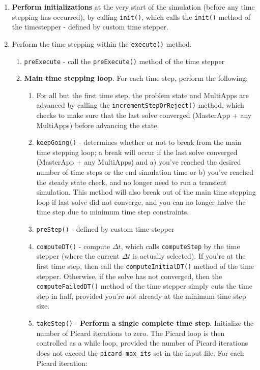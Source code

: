 \documentclass[10pt]{article}
\numberwithin{equation}{section} %
\begin{document}
\begin{enumerate}
\item {\bf Perform initializations} at the very start of the simulation (before any time stepping has occurred), by calling {\tt init()}, which calls the {\tt init()} method of the timestepper - defined by custom time stepper. 
\item Perform the time stepping within the {\tt execute()} method.
	\begin{enumerate}
	\item {\tt preExecute} - call the {\tt preExecute()} method of the time stepper%
	\item {\bf Main time stepping loop}. For each time step, perform the following:
		\begin{enumerate}
		\item For all but the first time step, the problem state and MultiApps are advanced by calling the {\tt incrementStepOrReject()} method, which checks to make sure that the last solve converged (MasterApp + any MultiApps) before advancing the state.
		\item {\tt keepGoing()} - determines whether or not to break from the main time stepping loop; a break will occur if the last solve converged (MasterApp + any MultiApps) and a) you've reached the desired number of time steps or the end simulation time or b) you've reached the steady state check, and no longer need to run a transient simulation. This method will also break out of the main time stepping loop if last solve did not converge, and you can no longer halve the time step due to minimum time step constraints.
		\item {\tt preStep()}  - defined by custom time stepper
		\item {\tt computeDT()} - compute \(\Delta t\), which calls {\tt computeStep} by the time stepper (where the current \(\Delta t\) is actually selected). If you're at the first time step, then call the {\tt computeInitialDT()} method of the time stepper. Otherwise, if the solve has not converged, then the {\tt computeFailedDT()}  method of the time stepper simply cuts the time step in half, provided you're not  already at the minimum time step size.
		\item {\tt takeStep()} - {\bf Perform a single complete time step}. Initialize the number of Picard iterations to zero. The Picard loop is then controlled as a while loop, provided the number of Picard iterations does not exceed the {\tt picard\_max\_its} set in the input file. For each Picard iteration:

\end{enumerate}
\end{enumerate}
\end{enumerate}
\end{document}
